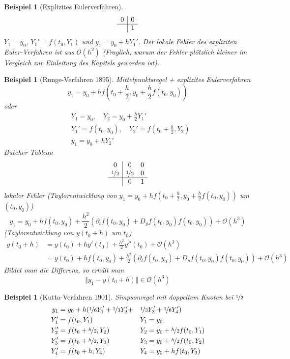 \documentclass[12pt]{article}
\theoremstyle{break}
\newtheorem{example}[theorem]{Beispiel}
\begin{document}
\begin{example}[Explizites Eulerverfahren]
$$\begin{array}{c|c} 0 & 0 \\ \hline & 1 \end{array}$$
$Y_1 = y_0$, $Y_1' = f(t_0, Y_1)$ und $y_1 = y_0 + hY_1'$. Der lokale Fehler des expliziten Euler-Verfahren ist aus $\mathcal{O}(h^2)$ (Fraglich, warum der Fehler plötzlich kleiner im Vergleich zur Einleitung des Kapitels geworden ist).
\end{example}

\begin{example}[Runge-Verfahren 1895]
Mittelpunktsregel + explizites Eulerverfahren
$$y_1 = y_0 + hf(t_0 + \frac{h}{2}, y_0 + \frac{h}{2}f(t_0, y_0))$$
oder
\begin{align*}
&Y_1 = y_0, \quad Y_2 = y_0 + \frac{h}{2}Y_1' \\
&Y_1' = f(t_0, y_0), \quad Y_2' = f(t_0 + \frac{h}{2}, Y_2) \\
&y_1 = y_0 + hY_2'
\end{align*}
Butcher Tableau
$$\begin{array}{c|cc} 0 & 0 & 0 \\ \nicefrac{1}{2} & \nicefrac{1}{2} & 0 \\ \hline & 0 & 1\end{array}$$
lokaler Fehler (Taylorentwicklung von $y_1 = y_0 + hf(t_0 + \frac{h}{2} , y_0 + \frac{h}{2}f(t_0, y_0))$ um $(t_0, y_0)$)
$$y_1 = y_0 + hf(t_0, y_0) + \frac{h^2}{2}( \partial_t f(t_0, y_0) + D_y f(t_0, y_0) f(t_0,y_0)) + \mathcal{O}(h^3)$$
(Taylorentwicklung von $y(t_0 + h)$ um $t_0$)
\begin{align*}
y(t_0 + h) &= y(t_0) + hy'(t_0) + \frac{h^2}{2} y''(t_0) + \mathcal{O}(h^3) &\\
&= y(t_0) + hf(t_0, y_0) + \frac{h^2}{2} \left( \partial_tf(t_0, y_0) + D_y f(t_0,y_0)f(t_0,y_0) \right) + \mathcal{O}(h^3)
\end{align*}
Bildet man die Differenz, so erhält man
$$ \Vert y_1 - y(t_0 + h) \Vert \in \mathcal{O}(h^3)$$
\end{example}

\begin{example}[Kutta-Verfahren 1901]
Simpsonregel mit doppeltem Knoten bei $\nicefrac{1}{2}$
\begin{alignat*}{3}
y_1 &= y_0 + h( \nicefrac{1}{6}Y_1' + \nicefrac{1}{3}Y_2' + &&\nicefrac{1}{3}Y_3' + \nicefrac{1}{6}Y_4' ) \\
Y_1' &= f(t_0, Y_1) \quad  &&Y_1 = y_0 \\
Y_2' &= f(t_0 + \nicefrac{h}{2} , Y_2) \quad  &&Y_2 = y_0 + \nicefrac{h}{2} f(t_0, Y_1)\\
Y_3' &= f(t_0 + \nicefrac{h}{2} , Y_3) \quad  &&Y_3 = y_0 + \nicefrac{h}{2} f(t_0, Y_2)\\
Y_4' &= f(t_0 + h , Y_4) \quad  &&Y_4 = y_0 + h f(t_0, Y_3)\\
\end{alignat*}
\end{example}
\end{document}
